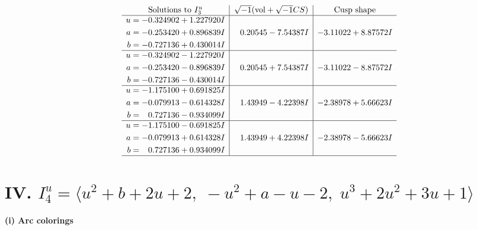 \documentclass[1p]{elsarticle_modified}
\theoremstyle{definition}
\newcommand{\I}{\sqrt{-1}}
\begin{document}
$$\begin{array}{c|c|c}  
\text{Solutions to }I^u_{3}& \I (\text{vol} + \sqrt{-1}CS) & \text{Cusp shape}\\
 \hline 
\begin{aligned}
u &= -0.324902 + 1.227920 I \\
a &= -0.253420 + 0.896839 I \\
b &= -0.727136 + 0.430014 I\end{aligned}
 & \phantom{-}0.20545 - 7.54387 I & -3.11022 + 8.87572 I \\ \hline\begin{aligned}
u &= -0.324902 - 1.227920 I \\
a &= -0.253420 - 0.896839 I \\
b &= -0.727136 - 0.430014 I\end{aligned}
 & \phantom{-}0.20545 + 7.54387 I & -3.11022 - 8.87572 I \\ \hline\begin{aligned}
u &= -1.175100 + 0.691825 I \\
a &= -0.079913 - 0.614328 I \\
b &= \phantom{-}0.727136 - 0.934099 I\end{aligned}
 & \phantom{-}1.43949 - 4.22398 I & -2.38978 + 5.66623 I \\ \hline\begin{aligned}
u &= -1.175100 - 0.691825 I \\
a &= -0.079913 + 0.614328 I \\
b &= \phantom{-}0.727136 + 0.934099 I\end{aligned}
 & \phantom{-}1.43949 + 4.22398 I & -2.38978 - 5.66623 I\\
 \hline 
 \end{array}$$\newpage\newpage\renewcommand{\arraystretch}{1}
\centering \section*{IV. $I^u_{4}= \langle u^2+b+2 u+2,\;- u^2+a- u-2,\;u^3+2 u^2+3 u+1 \rangle$}
\flushleft \textbf{(i) Arc colorings}\\
\end{document}
